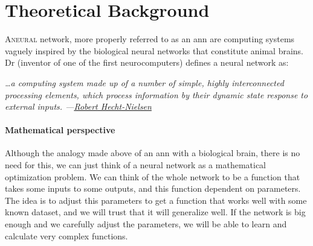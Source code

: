 

\chapter{Theoretical Background}




\lettrine{A}{neural} network, more properly referred to as an \gls{ann} are
computing systems vaguely inspired by the biological neural networks that
constitute animal brains. Dr
 (inventor of one of the first neurocomputers) defines a neural
network as:

\begin{quoteBox}
  \itshape
  \ldots a computing system made up of a number of simple, highly interconnected
  processing elements, which process information by their dynamic state response
  to external inputs.
  \tcblower
  \hfill \upshape
  ---\href{https://en.wikipedia.org/wiki/Robert_Hecht-Nielsen}
  {Robert Hecht-Nielsen}
\end{quoteBox}

\subsubsection{Mathematical perspective}
Although the analogy made above of an \gls{ann} with a biological brain, there
is no need for this, we can just think of a neural network as a mathematical
optimization problem. We can think of the whole network to be a function that
takes some inputs to some outputs, and this function dependent on
parameters. The idea is to adjust this parameters to get a function that works
well with some known dataset, and we will trust that it will generalize
well. If the network is big enough and we carefully adjust the parameters, we
will be able to learn and calculate very complex functions.


